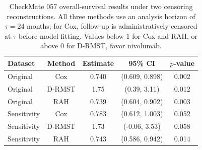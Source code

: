 \begin{table}[ht]
\centering
\caption{CheckMate 057 overall-survival results under two censoring reconstructions. All three methods use an analysis horizon of $\tau=24$ months; for Cox, follow-up is administratively censored at $\tau$ before model fitting. Values below 1 for Cox and RAH, or above 0 for D-RMST, favor nivolumab.}
\label{tab:results-cm057-intro}
\begin{tabular}{lcccc}
\toprule
Dataset & Method & Estimate & 95\% CI & $p$-value
\\
\midrule
Original & Cox & 0.740 & (0.609, 0.898) & 0.002 \\
Original & D-RMST & 1.75 & (0.39, 3.11) & 0.012 \\
Original & RAH & 0.739 & (0.604, 0.902) & 0.003 \\
Sensitivity & Cox & 0.783 & (0.612, 1.003) & 0.052 \\
Sensitivity & D-RMST & 1.73 & (-0.06, 3.53) & 0.058 \\
Sensitivity & RAH & 0.743 & (0.586, 0.942) & 0.014 \\
\bottomrule
\end{tabular}
\end{table}
